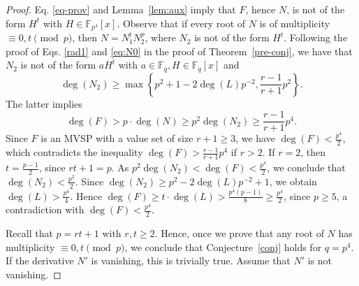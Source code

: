 \documentclass[11pt]{amsart}
\newcommand{\F}{\mathbb{F}}
\theoremstyle{definition}
\theoremstyle{remark}
\begin{document}
\begin{proof}
Eq. \eqref{eq-prov} and  Lemma~\ref{lem:aux} imply  that $F$, hence $N$, is not of the form $H^t$ with $H\in \F_{p^4}[x]$. 
Observe that  if  every root of $N$ is of multiplicity $\equiv 0, t\pmod p$, then $N=N_1^tN_2^p$, where $N_2$ is not of the form $H^t$. Following the proof of  Eqs. \eqref{rad1} and 
\eqref{eq:N0}   in the proof of Theorem~\ref{pre-conj}, we have that  $N_2$ is not of the form $aH^t$ with $a\in \F_q, H\in \F_q[x]$ and $$\deg(N_2)\ge \max\left\{p^2+1-2\deg(L)p^{-2}, \frac{r-1}{r+1}p^2\right\}.$$
The latter implies 
 $$\deg(F)>p\cdot \deg(N)\ge p^2\deg(N_2)\ge \frac{r-1}{r+1}p^4.$$ 
  Since $F$ is an MVSP with a value set of size $r+1\ge 3$, we have $\deg(F)<\frac{p^4}{2}$, which  contradicts the inequality  $\deg(F)>\frac{r-1}{r+1}p^4$ if $r>2$. If $r=2$, then $t=\frac{p-1}{2}$, since $rt+1=p$. As $p^2\deg(N_2)<\deg(F)<\frac{p^4}{2}$, we conclude that $\deg(N_2)<\frac{p^2}{2}$. Since  $\deg(N_2)\ge p^2-2\deg(L)p^{-2}+1$, we obtain $\deg(L)>\frac{p^4}{4}$. Hence $\deg(F)\ge t\cdot \deg(L)>\frac{p^4(p-1)}{8}\ge \frac{p^4}{2}$, since $p\ge 5$, a contradiction with  $\deg(F)<\frac{p^4}{2}$.  
  
  Recall that $p=rt+1$ with $r, t\ge 2$.  Hence,  once we prove that any root of $N$ has multiplicity $\equiv 0, t\pmod p$, we conclude that Conjecture~\ref{conj} holds for $q=p^4$.  If the derivative $N'$ is vanishing, this is trivially true. Assume that $N'$ is not vanishing.


\end{proof}
\end{document}
